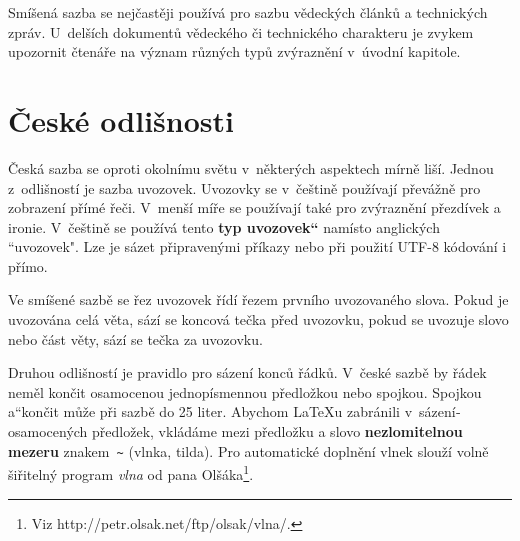 \documentclass[a4paper, twocolumn, 11pt]{article}
\begin{document}
Smíšená sazba se nejčastěji používá pro sazbu vědeckých článků a technických zpráv. U~delší­ch dokumentů vědeckého či technického charakteru je zvykem upozornit čtenáře na význam různých typů zvýrazně\-ní­ v~úvodní­ kapitole.

\section{České odlišnosti}

Česká sazba se oproti okolní­mu světu v~některých as\-pektech mí­rně liší­. Jednou z~odlišností je sazba uvozovek. Uvozovky se v~češtině použí­vají­ převážně pro zobrazení­ pří­mé řeči. V~menší­ míře se použí­vají­ také pro zvýraznění­ přezdí­vek a ironie. V~češtině se použí\-­vá tento \textbf{\quotedblbase typ uvozovek\textquotedblleft} namí­sto anglických \textquotedblleft uvo\-zovek". Lze je sázet připravenými příkazy nebo při \linebreak použití UTF-8 kódování i přímo.

Ve smíšené sazbě se řez uvozovek ří­dí­ řezem první­ho uvozovaného slova. Pokud je uvozována celá věta, sází­ se koncová tečka před uvozovku, pokud se uvozuje slovo nebo část věty, sází­ se tečka za uvozovku.

Druhou odlišností je pravidlo pro sázení­ konců řád\-ků. V~české sazbě by řádek neměl končit osamocenou jednopí­smennou předložkou nebo spojkou. Spojkou \quotedblbase a\textquotedblleft \space končit může při sazbě do 25 liter. Abychom \LaTeX u zabránili v~sázení­ osamocených předložek, vkládáme mezi předložku a slovo \textbf{nezlomitelnou mezeru} znakem\verb! ~! (vlnka, tilda). Pro automatické do\-plnění vlnek slouží­ volně šiřitelný program \emph{vlna} od pana Olšáka\footnote{Viz http://petr.olsak.net/ftp/olsak/vlna/.}.
\end{document}
